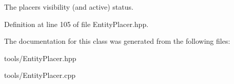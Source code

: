 The placer\textquotesingle{}s visibility (and active) status. 



Definition at line 105 of file Entity\+Placer.\+hpp.



The documentation for this class was generated from the following files\+:\begin{DoxyCompactItemize}
\item 
tools/Entity\+Placer.\+hpp\item 
tools/Entity\+Placer.\+cpp\end{DoxyCompactItemize}
